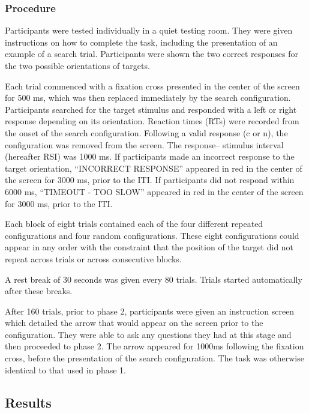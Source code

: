 \documentclass[
  man,floatsintext]{apa7}
\begin{document}
\hypertarget{procedure}{%
\subsubsection{Procedure}\label{procedure}}

Participants were tested individually in a quiet testing room. They were given instructions on how to complete the task, including the presentation of an example of a search trial. Participants were shown the two correct responses for the two possible orientations of targets.

Each trial commenced with a fixation cross presented in the center of the screen for 500 ms, which was then replaced immediately by the search configuration. Participants searched for the target stimulus and responded with a left or right response depending on its orientation. Reaction times (RTs) were recorded from the onset of the search configuration. Following a valid response (c or n), the configuration was removed from the screen. The response-- stimulus interval (hereafter RSI) was 1000 ms. If participants made an incorrect response to the target orientation, ``INCORRECT RESPONSE'' appeared in red in the center of the screen for 3000 ms, prior to the ITI. If participants did not respond within 6000 ms, ``TIMEOUT - TOO SLOW'' appeared in red in the center of the screen for 3000 ms, prior to the ITI.

Each block of eight trials contained each of the four different repeated configurations and four random configurations. These eight configurations could appear in any order with the constraint that the position of the target did not repeat across trials or across consecutive blocks.

A rest break of 30 seconds was given every 80 trials. Trials started automatically after these breaks.

After 160 trials, prior to phase 2, participants were given an instruction screen which detailed the arrow that would appear on the screen prior to the configuration. They were able to ask any questions they had at this stage and then proceeded to phase 2. The arrow appeared for 1000ms following the fixation cross, before the presentation of the search configuration. The task was otherwise identical to that used in phase 1.

\hypertarget{results}{%
\subsection{Results}\label{results}}
\end{document}
